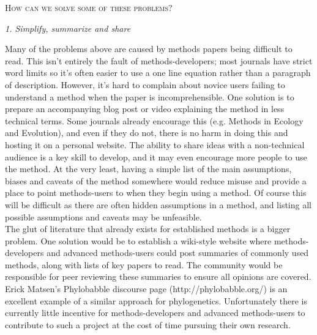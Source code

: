 \documentclass[a4paper,12pt]{article}
\renewcommand{\section}[1]{
  \bigskip
  \begin{center}
  \begin{Large}
  \normalfont\scshape #1
  \medskip
  \end{Large}
  \end{center}
}
\renewcommand{\subsection}[1]{
  \bigskip
  \begin{center}
  \begin{large}
  \normalfont\itshape #1
  \end{large}
  \end{center}
}
\begin{document}
\section{How can we solve some of these problems?}

\subsection{1. Simplify, summarize and share}
Many of the problems above are caused by methods papers being difficult to read. 
This isn't entirely the fault of methods-developers; most journals have strict word limits so it's often easier to use a one line equation rather than a paragraph of description. 
However, it's hard to complain about novice users failing to understand a method when the paper is incomprehensible. %
One solution is to prepare an accompanying blog post or video explaining the method in less technical terms. 
Some journals already encourage this (e.g. Methods in Ecology and Evolution), and even if they do not, there is no harm in doing this and hosting it on a personal website. 
The ability to share ideas with a non-technical audience is a key skill to develop, and it may even encourage more people to use the method. 
At the very least, having a simple list of the main assumptions, biases and caveats of the method somewhere would reduce misuse and provide a place to point methods-users to when they begin using a method.
Of course this will be difficult as there are often hidden assumptions in a method, and listing all possible assumptions and caveats may be unfeasible.\\

The glut of literature that already exists for established methods is a bigger problem. 
One solution would be to establish a wiki-style website where methods-developers and advanced methods-users could post summaries of commonly used methods, along with lists of key papers to read. 
The community would be responsible for peer reviewing these summaries to ensure all opinions are covered. 
Erick Matsen's Phylobabble discourse page (http://phylobabble.org/) is an excellent example of a similar approach for phylogenetics. Unfortunately there is currently little incentive for methods-developers and advanced methods-users to contribute to such a project at the cost of time pursuing their own research.\\
\end{document}
